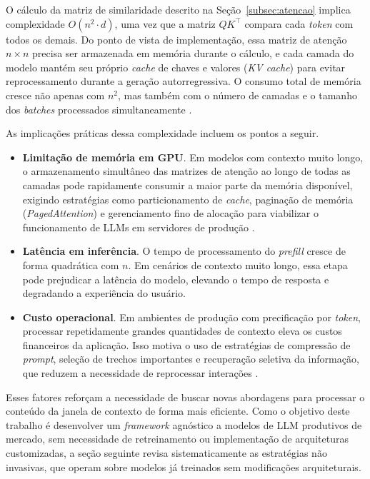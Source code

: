 O cálculo da matriz de similaridade descrito na Seção~\ref{subsec:atencao} implica complexidade $O(n^2 \cdot d)$, uma vez que a matriz $QK^{\top}$ compara cada \textit{token} com todos os demais. Do ponto de vista de implementação, essa matriz de atenção $n \times n$ precisa ser armazenada em memória durante o cálculo, e cada camada do modelo mantém seu próprio \textit{cache} de chaves e valores (\textit{KV cache}) para evitar reprocessamento durante a geração autorregressiva. O consumo total de memória cresce não apenas com $n^2$, mas também com o número de camadas e o tamanho dos \textit{batches} processados simultaneamente \cite{kwon2023pagedattention,miao2024serving}.

As implicações práticas dessa complexidade incluem os pontos a seguir.

\begin{itemize}[leftmargin=1.6em]
\item \textbf{Limitação de memória em GPU}. Em modelos com contexto muito longo, o armazenamento simultâneo das matrizes de atenção ao longo de todas as camadas pode rapidamente consumir a maior parte da memória disponível, exigindo estratégias como particionamento de \textit{cache}, paginação de memória (\textit{PagedAttention}) e gerenciamento fino de alocação para viabilizar o funcionamento de LLMs em servidores de produção \cite{kwon2023pagedattention}.

\item \textbf{Latência em inferência}. O tempo de processamento do \textit{prefill} cresce de forma quadrática com $n$. Em cenários de contexto muito longo, essa etapa pode prejudicar a latência do modelo, elevando o tempo de resposta e degradando a experiência do usuário.

\item \textbf{Custo operacional}. Em ambientes de produção com precificação por \textit{token}, processar repetidamente grandes quantidades de contexto eleva os custos financeiros da aplicação. Isso motiva o uso de estratégias de compressão de \textit{prompt}, seleção de trechos importantes e recuperação seletiva da informação, que reduzem a necessidade de reprocessar interações \cite{jiang2023llmlingua}.
\end{itemize}

Esses fatores reforçam a necessidade de buscar novas abordagens para processar o conteúdo da janela de contexto de forma mais eficiente. Como o objetivo deste trabalho é desenvolver um \textit{framework} agnóstico a modelos de LLM produtivos de mercado, sem necessidade de retreinamento ou implementação de arquiteturas customizadas, a seção seguinte revisa sistematicamente as estratégias não invasivas, que operam sobre modelos já treinados sem modificações arquiteturais.

